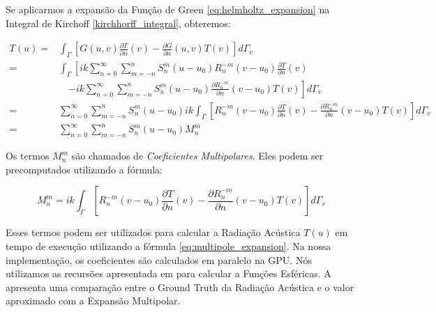 Se aplicarmos a expansão da Função de Green \eqref{eq:helmholtz_expansion} na Integral de Kirchoff \eqref{kirchhorff_integral}, obteremos:

\begin{equation}\label{eq:multipole_expansion}
\begin{split}
	T(u) =& \int_{\Gamma} \left[G(u, v)\frac{\partial T}{\partial n}(v) - \frac{\partial G}{\partial n}(u, v)T(v) \right] d\Gamma_v\\
	=& \int_{\Gamma} \left[ik \sum_{n=0}^{\infty} \sum_{m=-n}^n S_n^m(u - u_0)R_n^{-m}(v - u_0)\frac{\partial T}{\partial n}(v)\right.\\
	&\quad\left. - ik \sum_{n=0}^{\infty} \sum_{m=-n}^n S_n^m(u - u_0)\frac{\partial R_n^{-m}}{\partial n}(v - u_0)T(v) \right] d\Gamma_v\\
	=& \sum_{n=0}^{\infty} \sum_{m=-n}^n S_n^m(u - u_0)ik \int_{\Gamma}\left[ R_n^{-m}(v - u_0)\frac{\partial T}{\partial n}(v) -  \frac{\partial R_n^{-m}}{\partial n}(v - u_0)T(v)\right]d\Gamma_v\\
	=& \sum_{n=0}^{\infty} \sum_{m=-n}^n S_n^m(u - u_0)M_n^m
\end{split}
\end{equation}

Os termos $M_n^m$ são chamados de \emph{Coeficientes Multipolares}. Eles podem ser precomputados utilizando a fórmula:

\begin{equation}
	M_n^m = ik \int_{\Gamma}\left[ R_n^{-m}(v - u_0)\frac{\partial T}{\partial n}(v) -  \frac{\partial R_n^{-m}}{\partial n}(v - u_0)T(v)\right]d\Gamma_v
\end{equation}

Esses termos podem ser utilizados para calcular a Radiação Acústica $T(u)$ em tempo de execução utilizando a fórmula \eqref{eq:multipole_expansion}. Na nossa implementação, os coeficientes são calculados em paralelo na GPU. Nós utilizamos as recursões apresentada em \cite{press2007numerical} para calcular a Funções Esféricas. A  apresenta uma comparação entre o Ground Truth da Radiação Acústica e o valor aproximado com a Expansão Multipolar.  


